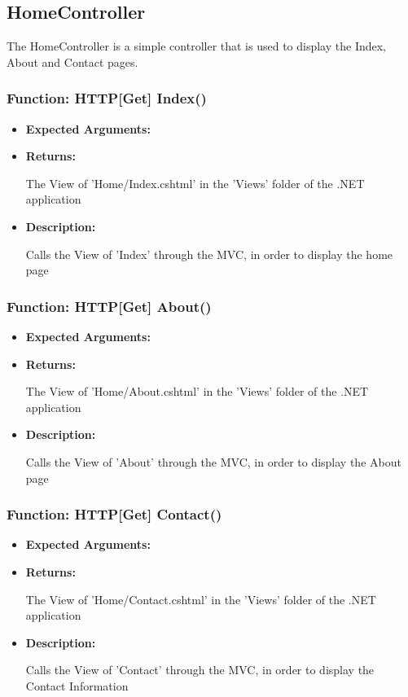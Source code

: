 \documentclass{scrreprt}
\begin{document}
\subsection{HomeController}
The HomeController is a simple controller that is used to display the Index, About and Contact pages.

\subsubsection{Function: HTTP[Get] Index()}
\begin{itemize}
    \item \textbf{Expected Arguments:}
    \item \textbf{Returns:}

    The View of 'Home/Index.cshtml' in the 'Views' folder of the .NET application

    \item \textbf{Description:}

    Calls the View of 'Index' through the MVC, in order to display the home page
\end{itemize}

\subsubsection{Function: HTTP[Get] About()}
\begin{itemize}
    \item \textbf{Expected Arguments:}
    \item \textbf{Returns:}

    The View of 'Home/About.cshtml' in the 'Views' folder of the .NET application

    \item \textbf{Description:}

    Calls the View of 'About' through the MVC, in order to display the About page
\end{itemize}

\subsubsection{Function: HTTP[Get] Contact()}
\begin{itemize}
    \item \textbf{Expected Arguments:}
    \item \textbf{Returns:}

    The View of 'Home/Contact.cshtml' in the 'Views' folder of the .NET application

    \item \textbf{Description:}

    Calls the View of 'Contact' through the MVC, in order to display the Contact Information
\end{itemize}
\end{document}
